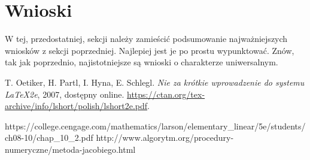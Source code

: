 \documentclass{classrep}
\begin{document}
\section{Wnioski}
{\color{blue}
W tej, przedostatniej, sekcji należy zamieścić podsumowanie najważniejszych
wniosków z sekcji poprzedniej. Najlepiej jest je po prostu wypunktować. Znów,
tak jak poprzednio, najistotniejsze są wnioski o charakterze uniwersalnym.}

\begin{thebibliography}{0}
   T. Oetiker, H. Partl, I. Hyna, E. Schlegl.
    \textsl{Nie za krótkie wprowadzenie do systemu \LaTeX2e}, 2007, dostępny
    online. \url{https://ctan.org/tex-archive/info/lshort/polish/lshort2e.pdf}.
\end{thebibliography}

{
https://college.cengage.com/mathematics/larson/elementary_linear/5e/students/ch08-10/chap_10_2.pdf
http://www.algorytm.org/procedury-numeryczne/metoda-jacobiego.html
}
\end{document}
